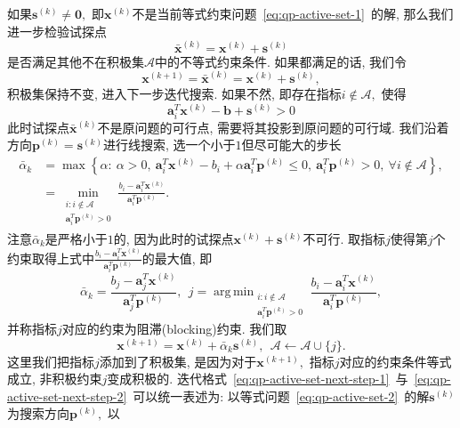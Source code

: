 \documentclass{SBCbookchapter}
\newcommand{\V}[1]{{\bm{#1}}}
\DeclareMathOperator*{\argmin}{arg\,min}
\numberwithin{equation}{section}
\begin{document}
如果$\V{s}^{(k)} \neq \V{0},$ 即$\V{x}^{(k)}$不是当前等式约束问题~\eqref{eq:qp-active-set-1}~的解, 那么我们进一步检验试探点
\begin{equation}
\label{eq:qp-active-set-test-point}
\bar{\V{x}}^{(k)} = \V{x}^{(k)} + \V{s}^{(k)}
\end{equation}
是否满足其他不在积极集$\mathcal{A}$中的不等式约束条件. 如果都满足的话, 我们令
\begin{equation}
\label{eq:qp-active-set-next-step-1}
\V{x}^{(k+1)} = \bar{\V{x}}^{(k)} = \V{x}^{(k)} + \V{s}^{(k)},
\end{equation}
积极集保持不变, 进入下一步迭代搜索. 如果不然, 即存在指标$i \not\in \mathcal{A},$ 使得
\begin{equation*}
\V{a}_i^T \V{x}^{(k)} - \V{b} + \V{s}^{(k)} > 0
\end{equation*}
此时试探点$\bar{\V{x}}^{(k)}$不是原问题的可行点, 需要将其投影到原问题的可行域. 我们沿着方向$\V{p}^{(k)} = \V{s}^{(k)}$进行线搜索, 选一个小于$1$但尽可能大的步长
\begin{equation}
\label{eq:qp-active-set-step-len-1}
\begin{aligned}
\bar{\alpha}_k & = \max \left\{ \alpha : ~ \alpha > 0, ~ \V{a}_i^T \V{x}^{(k)} - b_i + \alpha \V{a}_i^T \V{p}^{(k)} \leqslant 0, ~ \V{a}_i^T \V{p}^{(k)} > 0, ~ \forall i \not\in \mathcal{A} \right\}, \\
& = \min_{\substack{i: i \not\in \mathcal{A} \\ \V{a}_i^T \V{p}^{(k)} > 0}} \frac{b_i - \V{a}_i^T \V{x}^{(k)}}{\V{a}_i^T \V{p}^{(k)}}.
\end{aligned}
\end{equation}
注意$\bar{\alpha}_k$是严格小于$1$的, 因为此时的试探点$\V{x}^{(k)} + \V{s}^{(k)}$不可行. 取指标$j$使得第$j$个约束取得上式中$\frac{b_i - \V{a}_i^T \V{x}^{(k)}}{\V{a}_i^T \V{p}^{(k)}}$的最大值, 即
\begin{equation}
\label{eq:qp-active-set-step-len-2}
\bar{\alpha}_k = \frac{b_j - \V{a}_j^T \V{x}^{(k)}}{\V{a}_j^T \V{p}^{(k)}}, ~~ j = \argmin_{\substack{i: i \not\in \mathcal{A} \\ \V{a}_i^T \V{p}^{(k)} > 0}} \frac{b_i - \V{a}_i^T \V{x}^{(k)}}{\V{a}_i^T \V{p}^{(k)}},
\end{equation}
并称指标$j$对应的约束为阻滞(blocking)约束. 我们取
\begin{equation}
\label{eq:qp-active-set-next-step-2}
\V{x}^{(k+1)} = \V{x}^{(k)} + \bar{\alpha}_k \V{s}^{(k)}, ~~ \mathcal{A} \gets \mathcal{A} \cup \{ j \}.
\end{equation}
这里我们把指标$j$添加到了积极集, 是因为对于$\V{x}^{(k+1)},$ 指标$j$对应的约束条件等式成立, 非积极约束$j$变成积极的. 迭代格式~\eqref{eq:qp-active-set-next-step-1}~与~\eqref{eq:qp-active-set-next-step-2}~可以统一表述为: 以等式问题~\eqref{eq:qp-active-set-2}~的解$\V{s}^{(k)}$为搜索方向$\V{p}^{(k)},$ 以
\end{document}
